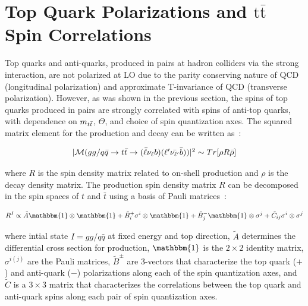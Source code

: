 \section{Top Quark Polarizations and \ensuremath{\mathrm{t\bar{t}}} Spin Correlations}
Top quarks and anti-quarks, produced in \ttbar pairs at hadron colliders via the strong interaction, are not polarized at LO due to the parity conserving nature of QCD (longitudinal polarization) and approximate T-invariance of QCD (transverse polarization).
However, as was shown in the previous section, the spins of top quarks produced in \ttbar pairs are strongly correlated with spins of anti-top quarks, with dependence on $m_{t\bar{t}}$, $\Theta$, and choice of spin quantization axes. 
The squared matrix element for the \ttbar production and decay can be written as~\cite{Bernreuther}:
\begin{linenomath*}
\begin{align}
\begin{array}{c}
\vert\mathcal{M}(gg/q\bar{q} \to t\bar{t} \to (\bar{\ell} \nu_\ell b)(\ell^\prime \bar{\nu_{\ell^\prime}} \bar{b}) )\vert^2 \sim Tr[\rho R \bar{\rho}]
\end{array}
\label{ttbar_squared_matrix_element}
\end{align}
\end{linenomath*}
where $R$ is the spin density matrix related to on-shell \ttbar production and $\rho$ is the decay density matrix.
The production spin density matrix $R$ can be decomposed in the spin spaces of $t$ and $\bar{t}$ using a basis of Pauli matrices~\cite{Bernreuther}:
\begin{linenomath*}
\begin{align}
R^I \propto \tilde{A} \mathbbm{1} \otimes  \mathbbm{1} + \tilde{B}_i^+ \sigma^i \otimes \mathbbm{1} + \tilde{B}_j^- \mathbbm{1} \otimes \sigma^j + \tilde{C}_{ij} \sigma^i \otimes \sigma^j
\label{spin_density_matrix_decomposition}
\end{align}
\end{linenomath*}
where intial state $I = gg / q\bar{q}$ at fixed energy and top direction, $\tilde{A}$ determines the differential cross section for \ttbar production, $\mathbbm{1}$ is the $2\times2$ identity matrix, $\sigma^{i(j)}$ are the Pauli matrices, $\tilde{B}^\pm$ are 3-vectors that characterize the top quark ($+$) and anti-quark ($-$) polarizations along each of the spin quantization axes, and $\tilde{C}$ is a $3\times3$ matrix that characterizes the correlations between the top quark and anti-quark spins along each pair of spin quantization axes.
